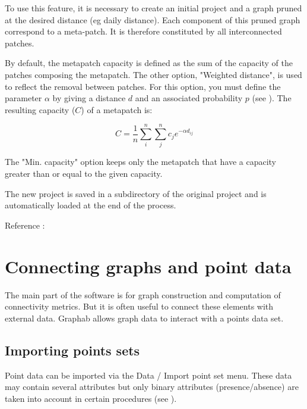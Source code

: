 \documentclass{article}
\begin{document}
To use this feature, it is necessary to create an initial project and a graph pruned at the desired distance (eg daily distance). Each component of this pruned graph correspond to a meta-patch. It is therefore constituted by all interconnected patches.

By default, the metapatch capacity is defined as the sum of the capacity of the patches composing the metapatch. The other option, "Weighted distance", is used to reflect the removal between patches. For this option, you must define the parameter $\alpha$ by giving a distance $d$ and an associated probability $p$ (see ). The resulting capacity ($C$) of a metapatch is:

$$C = \frac{1}{n}\sum_{i}^n\sum_{j}^n c_j e^{-\alpha d_{ij}}$$ 

The "Min. capacity" option keeps only the metapatch that have a capacity greater than or equal to the given capacity.

The new project is saved in a subdirectory of the original project and is automatically loaded at the end of the process.

Reference : \cite{2015_monkey}


\section{Connecting graphs and point data}

The main part of the software is for graph construction and computation of connectivity metrics. But it is often useful to connect these elements with external data. Graphab allows graph data to interact with a points data set.

\subsection{Importing points sets}

Point data can be imported via the Data / Import point set menu. These data may contain several attributes but only binary attributes (presence/absence) are taken into account in certain procedures (see ).
\end{document}
